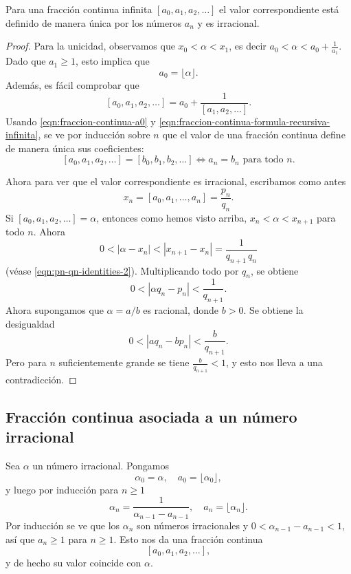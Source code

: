 \begin{proposicion}
  Para una fracción continua infinita $[a_0,a_1,a_2,\ldots]$ el valor
  correspondiente está definido de manera única por los números $a_n$ y es
  irracional.

  \begin{proof}
    Para la unicidad, observamos que $x_0 < \alpha < x_1$, es decir
    $a_0 < \alpha < a_0 + \frac{1}{a_1}$. Dado que $a_1 \ge 1$, esto implica
    que
    \begin{equation}
      \label{eqn:fraccion-continua-a0}
      a_0 = \lfloor \alpha\rfloor.
    \end{equation}
    Además, es fácil comprobar que
    \begin{equation}
      \label{eqn:fraccion-continua-formula-recursiva-infinita}
            [a_0,a_1,a_2,\ldots] = a_0 + \frac{1}{[a_1,a_2,\ldots]}.
    \end{equation}
    Usando \eqref{eqn:fraccion-continua-a0} y
    \eqref{eqn:fraccion-continua-formula-recursiva-infinita}, se ve por
    inducción sobre $n$ que el valor de una fracción continua define de manera
    única sus coeficientes:
    \[ [a_0,a_1,a_2,\ldots] = [b_0,b_1,b_2,\ldots] \iff
       a_n = b_n \text{ para todo }n. \]

    Ahora para ver que el valor correspondiente es irracional, escribamos como
    antes
    $$x_n = [a_0,a_1,\ldots,a_n] = \frac{p_n}{q_n}.$$
    Si $[a_0,a_1,a_2,\ldots] = \alpha$, entonces como hemos visto arriba,
    $x_n < \alpha < x_{n+1}$ para todo $n$. Ahora
    $$0 < |\alpha - x_n| < |x_{n+1} - x_n| = \frac{1}{q_{n+1}\,q_n}$$
    (véase \eqref{eqn:pn-qn-identities-2}). Multiplicando todo por $q_n$,
    se obtiene
    $$0 < |\alpha q_n - p_n| < \frac{1}{q_{n+1}}.$$
    Ahora supongamos que $\alpha = a/b$ es racional, donde $b > 0$. Se obtiene
    la desigualdad
    $$0 < |a q_n - b p_n| < \frac{b}{q_{n+1}}.$$
    Pero para $n$ suficientemente grande se tiene $\frac{b}{q_{n+1}} < 1$,
    y esto nos lleva a una contradicción.
  \end{proof}
\end{proposicion}

\subsection{Fracción continua asociada a un número irracional}

Sea $\alpha$ un número irracional. Pongamos
$$\alpha_0 = \alpha, \quad a_0 = \lfloor \alpha_0\rfloor,$$
y luego por inducción para $n \ge 1$
$$\alpha_n = \frac{1}{\alpha_{n-1} - a_{n-1}}, \quad a_n = \lfloor
\alpha_n\rfloor.$$ Por inducción se ve que los $\alpha_n$ son números
irracionales y $0 < \alpha_{n-1} - a_{n-1} < 1$, así que $a_n \ge 1$ para
$n \ge 1$. Esto nos da una fracción continua
$$[a_0,a_1,a_2,\ldots],$$
y de hecho su valor coincide con $\alpha$.

